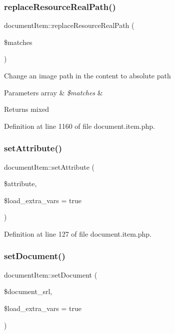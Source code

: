 \subsubsection{\texorpdfstring{replace\+Resource\+Real\+Path()}{replaceResourceRealPath()}}
{\footnotesize\ttfamily document\+Item\+::replace\+Resource\+Real\+Path (\begin{DoxyParamCaption}\item[{}]{\$matches }\end{DoxyParamCaption})}

Change an image path in the content to absolute path 
\begin{DoxyParams}[1]{Parameters}
array & {\em \$matches} & \\
\hline
\end{DoxyParams}
\begin{DoxyReturn}{Returns}
mixed 
\end{DoxyReturn}


Definition at line 1160 of file document.\+item.\+php.

\hypertarget{classdocumentItem_a456494e6f2ba42f247a1dec402b3ff3a}{}\label{classdocumentItem_a456494e6f2ba42f247a1dec402b3ff3a} 
\subsubsection{\texorpdfstring{set\+Attribute()}{setAttribute()}}
{\footnotesize\ttfamily document\+Item\+::set\+Attribute (\begin{DoxyParamCaption}\item[{}]{\$attribute,  }\item[{}]{\$load\+\_\+extra\+\_\+vars = {\ttfamily true} }\end{DoxyParamCaption})}



Definition at line 127 of file document.\+item.\+php.

\hypertarget{classdocumentItem_a2ea6b3cbf877ed27bc0f0ab935d35e97}{}\label{classdocumentItem_a2ea6b3cbf877ed27bc0f0ab935d35e97} 
\subsubsection{\texorpdfstring{set\+Document()}{setDocument()}}
{\footnotesize\ttfamily document\+Item\+::set\+Document (\begin{DoxyParamCaption}\item[{}]{\$document\+\_\+srl,  }\item[{}]{\$load\+\_\+extra\+\_\+vars = {\ttfamily true} }\end{DoxyParamCaption})}



